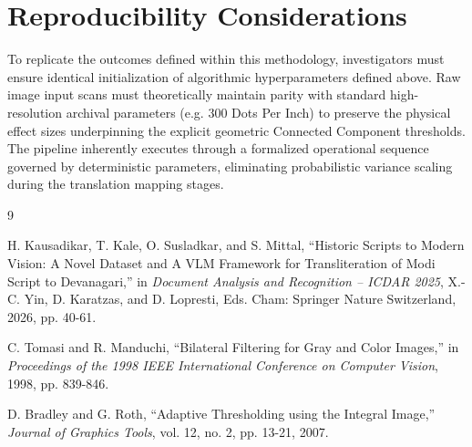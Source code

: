 \documentclass[journal, onecolumn]{IEEEtran}
\begin{document}
\section{Reproducibility Considerations}
To replicate the outcomes defined within this methodology, investigators must ensure identical initialization of algorithmic hyperparameters defined above. Raw image input scans must theoretically maintain parity with standard high-resolution archival parameters (e.g. 300 Dots Per Inch) to preserve the physical effect sizes underpinning the explicit geometric Connected Component thresholds. The pipeline inherently executes through a formalized operational sequence governed by deterministic parameters, eliminating probabilistic variance scaling during the translation mapping stages.

\begin{thebibliography}{9}

H. Kausadikar, T. Kale, O. Susladkar, and S. Mittal, ``Historic Scripts to Modern Vision: A Novel Dataset and A VLM Framework for Transliteration of Modi Script to Devanagari,'' in \emph{Document Analysis and Recognition -- ICDAR 2025}, X.-C. Yin, D. Karatzas, and D. Lopresti, Eds. Cham: Springer Nature Switzerland, 2026, pp. 40-61.

C. Tomasi and R. Manduchi, ``Bilateral Filtering for Gray and Color Images,'' in \emph{Proceedings of the 1998 IEEE International Conference on Computer Vision}, 1998, pp. 839-846.

D. Bradley and G. Roth, ``Adaptive Thresholding using the Integral Image,'' \emph{Journal of Graphics Tools}, vol. 12, no. 2, pp. 13-21, 2007.

\end{thebibliography}
\end{document}
